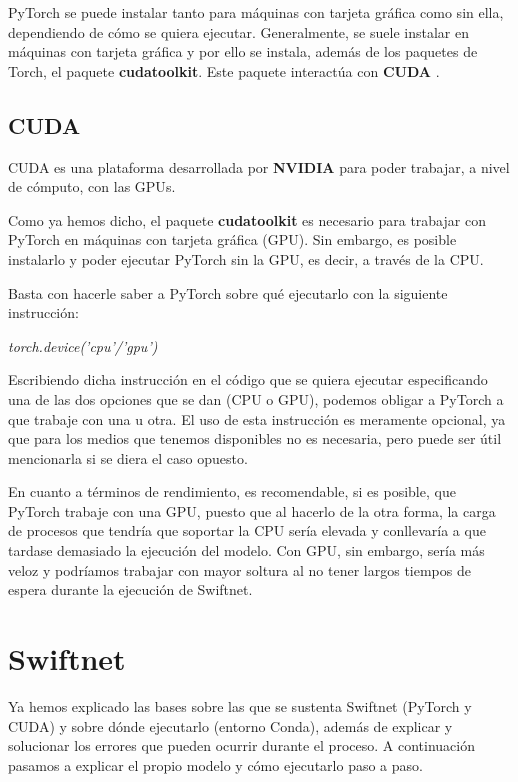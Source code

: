 PyTorch se puede instalar tanto para máquinas con tarjeta gráfica como sin ella, dependiendo de cómo se quiera ejecutar. Generalmente, se suele instalar en máquinas con tarjeta gráfica y por ello se instala, además de los paquetes de Torch, el paquete \textbf{cudatoolkit}. Este paquete interactúa con \textbf{CUDA} \cite {cuda}.

\subsection{CUDA}

CUDA \cite{cuda} es una plataforma desarrollada por \textbf{NVIDIA} para poder trabajar, a nivel de cómputo, con las \ac{GPU}s.

Como ya hemos dicho, el paquete \textbf{cudatoolkit} es necesario para trabajar con PyTorch en máquinas con tarjeta gráfica (\ac{GPU}). Sin embargo, es posible instalarlo y poder ejecutar PyTorch sin la \ac{GPU}, es decir, a través de la \ac{CPU}.

Basta con hacerle saber a PyTorch sobre qué ejecutarlo con la siguiente instrucción:

\begin{center}
\textit{torch.device('cpu'/'gpu')}
\end{center}

Escribiendo dicha instrucción en el código que se quiera ejecutar especificando una de las dos opciones que se dan (\ac{CPU} o \ac{GPU}), podemos obligar a PyTorch a que trabaje con una u otra. El uso de esta instrucción es meramente opcional, ya que para los medios que tenemos disponibles no es necesaria, pero puede ser útil mencionarla si se diera el caso opuesto.

En cuanto a términos de rendimiento, es recomendable, si es posible, que PyTorch trabaje con una \ac{GPU}, puesto que al hacerlo de la otra forma, la carga de procesos que tendría que soportar la \ac{CPU} sería elevada y conllevaría a que tardase demasiado la ejecución del modelo. Con \ac{GPU}, sin embargo, sería más veloz y podríamos trabajar con mayor soltura al no tener largos tiempos de espera durante la ejecución de Swiftnet.


\section{Swiftnet}

Ya hemos explicado las bases sobre las que se sustenta Swiftnet (PyTorch y CUDA) y sobre dónde ejecutarlo (entorno Conda), además de explicar y solucionar los errores que pueden ocurrir durante el proceso. A continuación pasamos a explicar el propio modelo y cómo ejecutarlo paso a paso.
